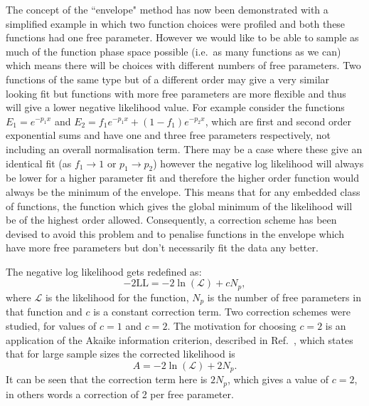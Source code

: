 The concept of the ``envelope" method has now been demonstrated with a simplified example in which two function choices were profiled and both these functions had one free parameter. However we would like to be able to sample as much of the function phase space possible (i.e.~as many functions as we can) which means there will be choices with different numbers of free parameters. Two functions of the same type but of a different order may give a very similar looking fit but functions with more free parameters are more flexible and thus will give a lower negative likelihood value. For example consider the functions $E_{1} = e^{-p_{1}x}$ and $E_{2} = f_{1}e^{-p_{1}x}+(1-f_{1})e^{-p_{2}x}$, which are first and second order exponential sums and have one and three free parameters respectively, not including an overall normalisation term. There may be a case where these give an identical fit (as $f_{1}\to 1$ or $p_{1}\to p_{2}$) however the negative log likelihood will always be lower for a higher parameter fit and therefore the higher order function would always be the minimum of the envelope. This means that for any embedded class of functions, the function which gives the global minimum of the likelihood will be of the highest order allowed. Consequently, a correction scheme has been devised to avoid this problem and to penalise functions in the envelope which have more free parameters but don't necessarily fit the data any better.

The negative log likelihood gets redefined as:
\begin{equation}
  -2\mathrm{LL} = -2\ln(\mathcal{L}) + cN_{p},
\end{equation}
where $\mathcal{L}$ is the likelihood for the function, $N_{p}$ is the number of free parameters in that function and $c$ is a constant correction term. Two correction schemes were studied, for values of $c=1$ and $c=2$. The motivation for choosing $c=2$ is an application of the Akaike information criterion, described in Ref.~\cite{akaike}, which states that for large sample sizes the corrected likelihood is
\begin{equation}
  A = -2\ln(\mathcal{L}) + 2N_{p}.
\end{equation}
It can be seen that the correction term here is $2N_{p}$, which gives a value of $c=2$, in others words a correction of 2 per free parameter. 

